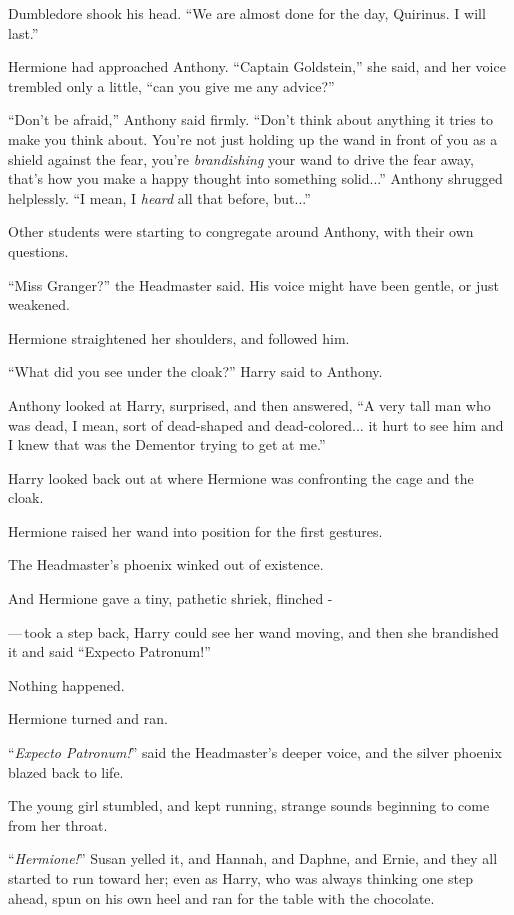Dumbledore shook his head. ``We are almost done for the day, Quirinus. I will last.''

Hermione had approached Anthony. ``Captain Goldstein,'' she said, and her voice trembled only a little, ``can you give me any advice?''

``Don't be afraid,'' Anthony said firmly. ``Don't think about anything it tries to make you think about. You're not just holding up the wand in front of you as a shield against the fear, you're \emph{brandishing} your wand to drive the fear away, that's how you make a happy thought into something solid...'' Anthony shrugged helplessly. ``I mean, I \emph{heard} all that before, but...''

Other students were starting to congregate around Anthony, with their own questions.

``Miss Granger?'' the Headmaster said. His voice might have been gentle, or just weakened.

Hermione straightened her shoulders, and followed him.

``What did you see under the cloak?'' Harry said to Anthony.

Anthony looked at Harry, surprised, and then answered, ``A very tall man who was dead, I mean, sort of dead-shaped and dead-colored... it hurt to see him and I knew that was the Dementor trying to get at me.''

Harry looked back out at where Hermione was confronting the cage and the cloak.

Hermione raised her wand into position for the first gestures.

The Headmaster's phoenix winked out of existence.

And Hermione gave a tiny, pathetic shriek, flinched -

---\,took a step back, Harry could see her wand moving, and then she brandished it and said ``Expecto Patronum!''

Nothing happened.

Hermione turned and ran.

``\emph{Expecto Patronum!}'' said the Headmaster's deeper voice, and the silver phoenix blazed back to life.

The young girl stumbled, and kept running, strange sounds beginning to come from her throat.

``\emph{Hermione!}'' Susan yelled it, and Hannah, and Daphne, and Ernie, and they all started to run toward her; even as Harry, who was always thinking one step ahead, spun on his own heel and ran for the table with the chocolate.

